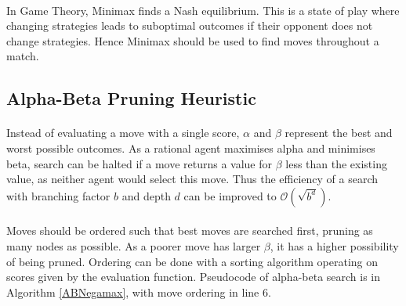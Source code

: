 \documentclass[12pt,a4paper]{book}
\begin{document}
\paragraph{} In Game Theory, Minimax finds a Nash equilibrium. This is a state of play where changing strategies leads to suboptimal outcomes if their opponent does not change strategies. Hence Minimax should be used to find moves throughout a match. \cite{russellNorvig} \cite{giraffe} \cite{carolus}

\subsection{Alpha-Beta Pruning Heuristic}

\paragraph{} Instead of evaluating a move with a single score, $\alpha$ and $\beta$ represent the best and worst possible outcomes. As a rational agent maximises alpha and minimises beta, search can be halted if a move returns a value for $\beta$ less than the existing value, as neither agent would select this move. Thus the efficiency of a search with branching factor $b$ and depth $d$ can be improved to $\mathcal{O}(\sqrt{b^d})$. 

\paragraph{} Moves should be ordered such that best moves are searched first, pruning as many nodes as possible. As a poorer move has larger $\beta$, it has a higher possibility of being pruned. Ordering can be done with a sorting algorithm operating on scores given by the evaluation function. \cite{russellNorvig} \cite{carolus} Pseudocode of alpha-beta search is in Algorithm \ref{ABNegamax}, with move ordering in line 6.
\end{document}
